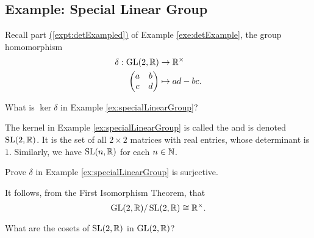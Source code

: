 \documentclass[../algebraNotesMSRI-UP2016.tex]{subfiles}
\begin{document}
\subsection[\subsecname]{Example: Special Linear Group}
\begin{frame}{\subsecname}
\begin{ex}\label{ex:specialLinearGroup}
Recall part \hyperref[expt:detExampled]{(\ref{expt:detExampled})} of Example \ref{exe:detExample}, the group homomorphism
\begin{align*}
\delta: \operatorname{GL}(2,\mathbb R) &\to \mathbb R^{\times} \\
	\begin{pmatrix}
		a & b \\
		c & d 
		\end{pmatrix} &\mapsto ad-bc.
\end{align*}
\end{ex}

\smallGap
\begin{que}
What is $\ker{\delta}$ in Example \ref{ex:specialLinearGroup}?
\end{que}
\end{frame}

\begin{frame}{}{}
The kernel in Example \ref{ex:specialLinearGroup} is called the  and is denoted $\operatorname{SL}(2,\mathbb R)$.  It is the set of all $2\times 2$ matrices with real entries, whose determinant is $1$.  Similarly, we have $\operatorname{SL}(n,\mathbb R)$ for each $n\in \mathbb N$.
\begin{exe}\label{exe:specialLinearGroup}
Prove $\delta$ in Example \ref{ex:specialLinearGroup} is surjective.
\end{exe}

\smallGap
It follows, from the First Isomorphism Theorem, that 
\[
\operatorname{GL}(2,\mathbb R)/\operatorname{SL}(2,\mathbb R)\cong \mathbb R^{\times}.
\]
\smallGap
\begin{que}
What are the cosets of $\operatorname{SL}(2,\mathbb R)$ in $\operatorname{GL}(2,\mathbb R)$?
\end{que}
\end{frame}
\end{document}
